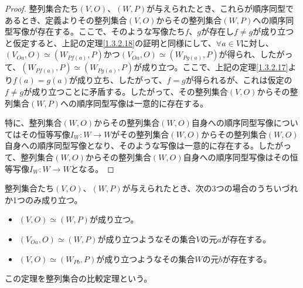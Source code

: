 \documentclass[dvipdfmx]{jsarticle}
\begin{document}
\begin{proof}
整列集合たち$(V,O)$、$(W,P)$が与えられたとき、これらが順序同型であるとき、定義よりその整列集合$(V,O)$からその整列集合$(W,P)$への順序同型写像が存在する。ここで、そのような写像たち$f$、$g$が存在し$f \neq g$が成り立つと仮定すると、上記の定理\ref{1.3.2.18}の証明と同様にして、$\forall a \in V$に対し、$\left( V_{Oa},O \right) \simeq \left( W_{Pf(a)},P \right)$かつ$\left( V_{Oa},O \right) \simeq \left( W_{Pg(a)},P \right)$が得られ、したがって、$\left( W_{Pf(a)},P \right) \simeq \left( W_{Pg(a)},P \right)$が成り立つ。ここで、上記の定理\ref{1.3.2.17}より$f(a) = g(a)$が成り立ち、したがって、$f = g$が得られるが、これは仮定の$f \neq g$が成り立つことに矛盾する。したがって、その整列集合$(V,O)$からその整列集合$(W,P)$への順序同型写像は一意的に存在する。\par
特に、整列集合$(W,O)$からその整列集合$(W,O)$自身への順序同型写像についてはその恒等写像$I_{W}:W \rightarrow W$がその整列集合$(W,O)$からその整列集合$(W,O)$自身への順序同型写像となり、そのような写像は一意的に存在する。したがって、整列集合$(W,O)$からその整列集合$(W,O)$自身への順序同型写像はその恒等写像$I_{W}:W \rightarrow W$となる。
\end{proof}
\begin{thm}[整列集合の比較定理]\label{1.3.2.20}
整列集合たち$(V,O)$、$(W,P)$が与えられたとき、次の3つの場合のうちいづれか1つのみ成り立つ。
\begin{itemize}
\item
  $(V,O) \simeq (W,P)$が成り立つ。
\item
  $\left( V_{Oa},O \right) \simeq (W,P)$が成り立つようなその集合$V$の元$a$が存在する。
\item
  $(V,O) \simeq \left( W_{Pb},P \right)$が成り立つようなその集合$W$の元$b$が存在する。
\end{itemize}
\end{thm}\par
この定理を整列集合の比較定理という。
\end{document}

